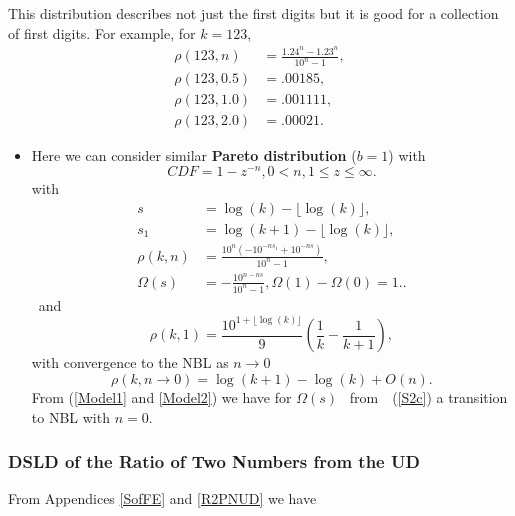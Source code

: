 \documentclass[titlepage,fleqn]{article}%
\begin{document}
This distribution describes not just the first digits but it is good for a
collection of first digits. For example, for $k=123$,%
\begin{align*}
\rho(123,n)  &  =\frac{1.24^{n}-1.23^{n}}{10^{n}-1},\\
\rho(123,0.5)  &  =.00185,\\
\rho(123,1.0)  &  =.001111,\\
\rho(123,2.0)  &  =.00021.
\end{align*}


\begin{itemize}
\item Here we can consider similar \textbf{Pareto distribution} ($b=1$) with
\[
CDF=1-z^{-n},0<n,1\leq z\leq\infty.
\]
with
\begin{align}
s  &  =\log(k)-\lfloor\log(k)\rfloor,\label{Model2}\\
s_{1}  &  =\log(k+1)-\lfloor\log(k)\rfloor,\nonumber\\
\rho(k,n)  &  =\frac{10^{n}\left(  -10^{-ns_{1}}+10^{-ns}\right)  }{10^{n}%
-1},\nonumber\\
\Omega(s)  &  =-\frac{10^{n-ns}}{10^{n}-1},\Omega(1)-\Omega(0)=1..\nonumber
\end{align}
\ and
\[
\rho(k,1)=\frac{10^{1+\lfloor\log(k)\rfloor}}{9}\left(  \frac{1}{k}-\frac
{1}{k+1}\right)  ,
\]
with convergence to the NBL as $n\rightarrow0$
\[
\rho(k,n\rightarrow0)=\log(k+1)-\log(k)+O(n).
\]
From (\ref{Model1} and \ref{Model2}) we have for $\Omega(s)$%
\ from\ \ (\ref{S2c}) a transition to NBL with $n=0.$
\end{itemize}

\subsubsection{DSLD of the Ratio of Two Numbers from the UD}%

\label{DofDRatio2UD}%


From Appendices
\ref{SofFE}
and
\ref{R2PNUD}
we have%
\end{document}
